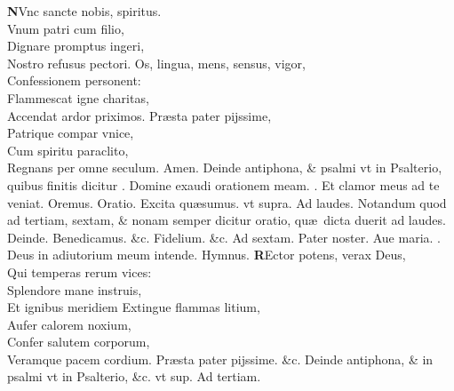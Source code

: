 \documentclass[a5paper,10pt]{book}
\makeatletter
\DeclareRobustCommand{\Vbar}{\vers@resp{-0.1em}{V}}
\DeclareRobustCommand{\Rbar}{\vers@resp{0pt}{R}}
\newcommand{\vers@resp@sym}{\raisebox{0.2ex}{\rotatebox[origin=c]{-20}{$\m@th\rceil$}}}
\newcommand{\vers@resp}[2]{%
  {\ooalign{\hidewidth\kern#1\vers@resp@sym\hidewidth\cr#2\cr}}%
}%
\def\ae{æ}
\makeatother
\begin{document}
\begin{multicols*}{2}
\lettrine[lines=2]{\bfseries \color{red} N}{}Vnc sancte nobis, spiritus.\\Vnum patri cum filio,\\Dignare promptus ingeri,\\Nostro refusus pectori.
\newline \color{red} O\color{black}s, lingua, mens, sensus, vigor,\\Confessionem personent:\\Flammescat igne charitas,\\Accendat ardor priximos.
\newline \color{red} P\color{black}r\ae sta pater pijssime,\\Patrique compar vnice,\\Cum spiritu paraclito,\\Regnans per omne seculum. Amen.
\newline {} \color{red} Deinde antiphona, \& psalmi vt in Psalterio, quibus finitis dicitur \Vbar . \color{black} Domine exaudi orationem meam. \color{red} \Rbar . \color{black} Et clamor meus ad te veniat. \color{red} O\color{black}remus. \color{red} Oratio. \color{black} Excita qu\ae sumus. \color{red} vt supra. \color{black}
\newline {} \color{red} Ad laudes. Notandum quod ad tertiam, sextam, \& nonam semper dicitur oratio, qu\ae \ dicta duerit ad laudes. Deinde. \color{black} Benedicamus. \color{red} \&c. \color{black} Fidelium. \color{red} \&c. \color{black}
\newline {} \color{red} Ad \hypertarget{DOM-PRIMA-ADV-SEX}{sextam.} \color{black}
Pater noster. Aue maria. \color{red} \Vbar . \color{black} Deus in adiutorium meum intende. \quad \color{red} Hymnus. \color{black}
\vspace{-.25em}
\lettrine[lines=2]{\bfseries \color{red} R}{}Ector potens, verax Deus,\\Qui temperas rerum vices:\\Splendore mane instruis,\\Et ignibus meridiem
\newline \color{red} E\color{black}xtingue flammas litium,\\Aufer calorem noxium,\\Confer salutem corporum,\\Veramque pacem cordium.
\newline \color{red} P\color{black}r\ae sta pater pijssime. \&c.
\newline {} \color{red} Deinde antiphona, \& in psalmi vt in Psalterio, \&c. vt sup. Ad tertiam.

\end{multicols*}
\end{document}

